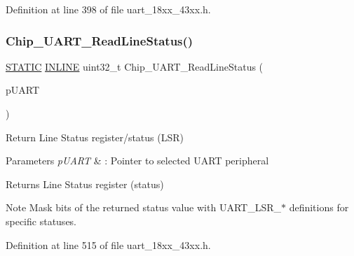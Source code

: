 Definition at line 398 of file uart\+\_\+18xx\+\_\+43xx.\+h.

\mbox{\label{group___u_a_r_t__18_x_x__43_x_x_gaf15ab7a9529d102b91760ed5587b279a}} 
\subsubsection{\texorpdfstring{Chip\+\_\+\+U\+A\+R\+T\+\_\+\+Read\+Line\+Status()}{Chip\_UART\_ReadLineStatus()}}
{\footnotesize\ttfamily \hyperlink{group___l_p_c___types___public___macros_ga10b2d890d871e1489bb02b7e70d9bdfb}{S\+T\+A\+T\+IC} \hyperlink{spifi__18xx__43xx_8h_a2eb6f9e0395b47b8d5e3eeae4fe0c116}{I\+N\+L\+I\+NE} uint32\+\_\+t Chip\+\_\+\+U\+A\+R\+T\+\_\+\+Read\+Line\+Status (\begin{DoxyParamCaption}\item[{\hyperlink{struct_l_p_c___u_s_a_r_t___t}{L\+P\+C\+\_\+\+U\+S\+A\+R\+T\+\_\+T} $\ast$}]{p\+U\+A\+RT }\end{DoxyParamCaption})}



Return Line Status register/status (L\+SR) 


\begin{DoxyParams}{Parameters}
{\em p\+U\+A\+RT} & \+: Pointer to selected U\+A\+RT peripheral \\
\hline
\end{DoxyParams}
\begin{DoxyReturn}{Returns}
Line Status register (status) 
\end{DoxyReturn}
\begin{DoxyNote}{Note}
Mask bits of the returned status value with U\+A\+R\+T\+\_\+\+L\+S\+R\+\_\+$\ast$ definitions for specific statuses. 
\end{DoxyNote}


Definition at line 515 of file uart\+\_\+18xx\+\_\+43xx.\+h.

\mbox{\label{group___u_a_r_t__18_x_x__43_x_x_gadef0e0d2ea30182cd99561efe9909707}} 
